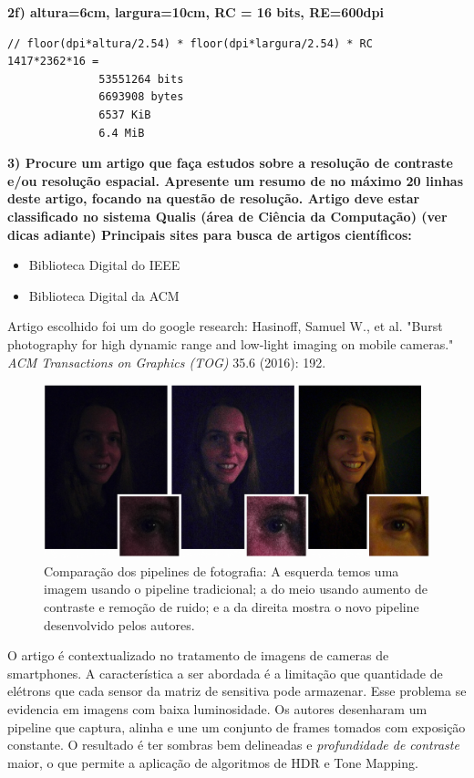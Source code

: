\documentclass[a4paper]{sbgames}               %
\begin{document}
\textbf{2f) altura=6cm, largura=10cm, RC = 16 bits, RE=600dpi}
\begin{lstlisting}
// floor(dpi*altura/2.54) * floor(dpi*largura/2.54) * RC
1417*2362*16 =
              53551264 bits
              6693908 bytes
              6537 KiB
              6.4 MiB
\end{lstlisting}

\textbf{3) Procure um artigo que faça estudos sobre a resolução de contraste e/ou resolução espacial. Apresente um resumo de no máximo 20 linhas deste artigo, focando na questão de resolução. Artigo deve estar classificado no sistema Qualis (área de Ciência da Computação) (ver dicas adiante) Principais sites para busca de artigos científicos:}
\begin{itemize}
\item Biblioteca Digital do IEEE
\item Biblioteca Digital da ACM
\end{itemize}

\pagebreak

Artigo escolhido foi um do google research: Hasinoff, Samuel W., et al. "Burst photography for high dynamic range and low-light imaging on mobile cameras." \textit{ACM Transactions on Graphics (TOG)} 35.6 (2016): 192. \cite{hasinoff2016burst}

\begin{figure} [h!]
  \centering 
  \includegraphics[width=0.95\linewidth]{imgs/burstgoogle}
 \caption{Comparação dos pipelines de fotografia: A esquerda temos uma imagem usando o pipeline tradicional; a do meio usando aumento de contraste e remoção de ruido; e a da direita mostra o novo pipeline desenvolvido pelos autores.} 
 \label{fig:burstgoogle} 
\end{figure}

O artigo é contextualizado no tratamento de imagens de cameras de smartphones. A característica a ser abordada é  a limitação que quantidade de elétrons que cada sensor da matriz de sensitiva pode armazenar. Esse problema se evidencia em imagens com baixa luminosidade. Os autores desenharam um pipeline que captura, alinha e une um conjunto de frames tomados com exposição constante. O resultado é ter sombras bem delineadas e \textit{profundidade de contraste} maior, o que permite a aplicação de algoritmos de HDR e Tone Mapping. 
\end{document}
